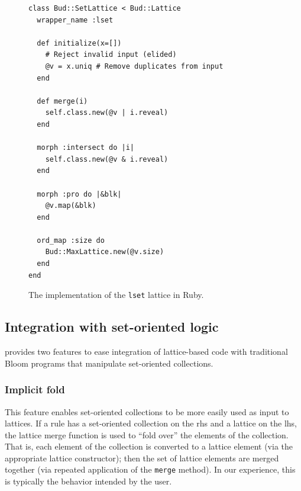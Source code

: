 \begin{figure}[t]
\begin{scriptsize}
\begin{lstlisting}
class Bud::SetLattice < Bud::Lattice
  wrapper_name :lset

  def initialize(x=[])
    # Reject invalid input (elided)
    @v = x.uniq # Remove duplicates from input
  end

  def merge(i)
    self.class.new(@v | i.reveal)
  end

  morph :intersect do |i|
    self.class.new(@v & i.reveal)
  end

  morph :pro do |&blk|
    @v.map(&blk)
  end

  ord_map :size do
    Bud::MaxLattice.new(@v.size)
  end
end
\end{lstlisting}
\end{scriptsize}
\caption{The implementation of the \texttt{lset} lattice in Ruby.}
\label{fig:lattice-set}
\end{figure}

\subsection{Integration with set-oriented logic}
\label{sec:bloom-interop}

\lang provides two features to ease integration of lattice-based code with
traditional Bloom programs that manipulate set-oriented collections.

\subsubsection{Implicit fold}
This feature enables set-oriented collections to be more easily used as input to
lattices. If a \lang rule has a set-oriented collection on the rhs and a lattice
on the lhs, the lattice merge function is used to ``fold over'' the elements of
the collection. That is, each element of the collection is converted to a
lattice element (via the appropriate lattice constructor); then the set of
lattice elements are merged together (via repeated application of the
\texttt{merge} method). In our experience, this is typically the behavior
intended by the user.

